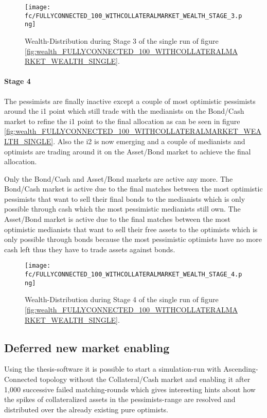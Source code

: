 \documentclass[Bachelorarbeit.tex]{subfiles}
\begin{document}
\begin{figure}[H]
	\centering
  \texttt{[image: fc/FULLYCONNECTED\_100\_WITHCOLLATERALMARKET\_WEALTH\_STAGE\_3.png]}
  	\caption{Wealth-Distribution during Stage 3 of the single run of figure \ref{fig:wealth_FULLYCONNECTED_100_WITHCOLLATERALMARKET_WEALTH_SINGLE}.}
	\label{fig:markets_FULLYCONNECTED_100_WITHCOLLATERALMARKET_WEALTH_STAGE_3}
\end{figure}

\paragraph{Stage 4}
The pessimists are finally inactive except a couple of most optimistic pessimists around the i1 point which still trade with the medianists on the Bond/Cash market to refine the i1 point to the final allocation as can be seen in figure \ref{fig:wealth_FULLYCONNECTED_100_WITHCOLLATERALMARKET_WEALTH_SINGLE}. Also the i2 is now emerging and a couple of medianists and optimists are trading around it on the Asset/Bond market to achieve the final allocation.

\medskip

Only the Bond/Cash and Asset/Bond markets are active any more. The Bond/Cash market is active due to the final matches between the most optimistic pessimists that want to sell their final bonds to the medianists which is only possible through cash which the most pessimistic medianists still own. The Asset/Bond market is active due to the final matches between the most optimistic medianists that want to sell their free assets to the optimists which is only possible through bonds because the most pessimistic optimists have no more cash left thus they have to trade assets against bonds.

\begin{figure}[H]
	\centering
  \texttt{[image: fc/FULLYCONNECTED\_100\_WITHCOLLATERALMARKET\_WEALTH\_STAGE\_4.png]}
  	\caption{Wealth-Distribution during Stage 4 of the single run of figure \ref{fig:wealth_FULLYCONNECTED_100_WITHCOLLATERALMARKET_WEALTH_SINGLE}.}
	\label{fig:markets_FULLYCONNECTED_100_WITHCOLLATERALMARKET_WEALTH_STAGE_4}
\end{figure}

\subsection{Deferred new market enabling}
Using the thesis-software it is possible to start a simulation-run with Ascending-Connected topology without the Collateral/Cash market and enabling it after 1,000 successive failed matching-rounds which gives interesting hints about how the spikes of collateralized assets in the pessimists-range are resolved and distributed over the already existing pure optimists.
\end{document}
